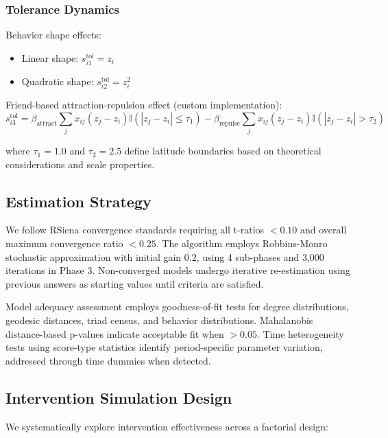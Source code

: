 \documentclass[12pt,a4paper]{article}
\begin{document}
\subsubsection{Tolerance Dynamics}

Behavior shape effects:
\begin{itemize}
\item Linear shape: $s_{i1}^{\text{tol}} = z_i$
\item Quadratic shape: $s_{i2}^{\text{tol}} = z_i^2$
\end{itemize}

Friend-based attraction-repulsion effect (custom implementation):
\begin{equation}
s_{i3}^{\text{tol}} = \beta_{\text{attract}} \sum_j x_{ij} (z_j - z_i) \mathbb{I}(|z_j - z_i| \leq \tau_1) - \beta_{\text{repulse}} \sum_j x_{ij} (z_j - z_i) \mathbb{I}(|z_j - z_i| > \tau_2)
\end{equation}

where $\tau_1 = 1.0$ and $\tau_2 = 2.5$ define latitude boundaries based on theoretical considerations and scale properties.

\subsection{Estimation Strategy}

We follow RSiena convergence standards requiring all t-ratios $< 0.10$ and overall maximum convergence ratio $< 0.25$. The algorithm employs Robbins-Monro stochastic approximation with initial gain 0.2, using 4 sub-phases and 3,000 iterations in Phase 3. Non-converged models undergo iterative re-estimation using previous answers as starting values until criteria are satisfied.

Model adequacy assessment employs goodness-of-fit tests for degree distributions, geodesic distances, triad census, and behavior distributions. Mahalanobis distance-based p-values indicate acceptable fit when $> 0.05$. Time heterogeneity tests using score-type statistics identify period-specific parameter variation, addressed through time dummies when detected.

\subsection{Intervention Simulation Design}

We systematically explore intervention effectiveness across a factorial design:
\end{document}
